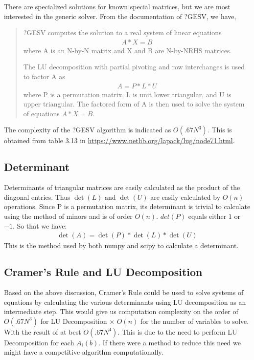 \documentclass[12pt]{article}
\begin{document}
There are specialized solutions for known special matrices, but we are most interested in the generic solver. From the documentation of ?GESV, we have, 
\begin{quote}
?GESV computes the solution to a real system of linear equations
\begin{align*}
	A * X = B
\end{align*}
where A is an N-by-N matrix and X and B are N-by-NRHS matrices.

The LU decomposition with partial pivoting and row interchanges is
used to factor A as
\begin{align*}
	A = P * L * U
\end{align*}
where P is a permutation matrix, L is unit lower triangular, and U is
upper triangular.  The factored form of A is then used to solve the
system of equations $A * X = B$.
\end{quote}
The complexity of the ?GESV algorithm is indicated as $O(.67N^3)$. This is obtained from table 3.13 in \url{https://www.netlib.org/lapack/lug/node71.html}.

\subsection*{Determinant}
Determinants of triangular matrices are easily calculated as the product of the diagonal entries. Thus $\det(L)$ and $\det(U)$ are easily calculated by $O(n)$ operations. Since P is a permutation matrix, its determinant is trivial to calculate using the method of minors and is of order $O(n)$. $det(P)$ equals either $1$ or $-1$. So that we have:
\begin{align*}
	\det(A) = \det(P) * \det(L) * \det(U)
\end{align*}
This is the method used by both numpy and scipy to calculate a determinant.

\subsection*{Cramer's Rule and LU Decomposition}
Based on the above discussion, Cramer's Rule could be used to solve systems of equations by calculating the various determinants using LU decomposition as an intermediate step. This would give us computation complexity on the order of $O(.67N^3)$ for LU Decomposition $\times$ $O(n)$ for the number of variables to solve. With the result of at best $O(.67N^4)$. This is due to the need to perform LU Decomposition for each $A_i(b)$. If there were a method to reduce this need we might have a competitive algorithm computationally.
\end{document}
